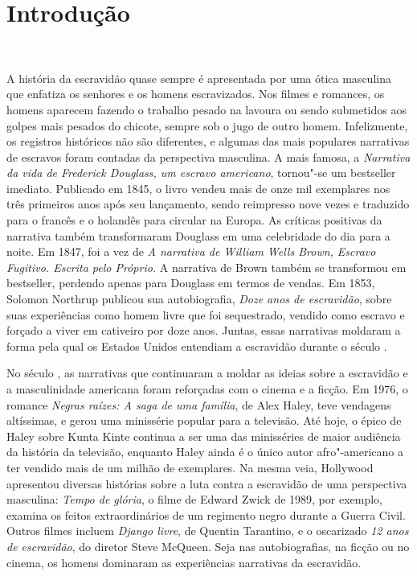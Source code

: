 \chapter*{Introdução} %

\begin{flushright}
\\\vspace{-3pt}
\end{flushright}

A história da escravidão quase sempre é apresentada por uma ótica
masculina que enfatiza os senhores e os homens escravizados. Nos filmes
e romances, os homens aparecem fazendo o trabalho pesado na lavoura ou
sendo submetidos aos golpes mais pesados do chicote, sempre sob o jugo
de outro homem. Infelizmente, os registros históricos não são
diferentes, e algumas das mais populares narrativas de escravos foram
contadas da perspectiva masculina. A mais famosa, a \emph{Narrativa da
vida de Frederick Douglass, um escravo americano}, tornou"-se um
bestseller imediato. Publicado em 1845, o livro vendeu mais de onze mil
exemplares nos três primeiros anos após seu lançamento, sendo reimpresso
nove vezes e traduzido para o francês e o holandês para circular na
Europa. As críticas positivas da narrativa também transformaram Douglass
em uma celebridade do dia para a noite. Em 1847, foi a vez de \emph{A
narrativa de William Wells Brown, Escravo Fugitivo. Escrita pelo
Próprio.} A narrativa de Brown também se transformou em bestseller,
perdendo apenas para Douglass em termos de vendas. Em 1853, Solomon
Northrup publicou sua autobiografia, \emph{Doze anos de escravidão},
sobre suas experiências como homem livre que foi sequestrado, vendido
como escravo e forçado a viver em cativeiro por doze anos. Juntas, essas
narrativas moldaram a forma pela qual os Estados Unidos entendiam a escravidão
durante o século .

No século , as narrativas que continuaram a moldar as ideias sobre a
escravidão e a masculinidade americana foram reforçadas com o cinema e a
ficção. Em 1976, o romance \emph{Negras raízes: A saga de uma família},
de Alex Haley, teve vendagens altíssimas, e gerou uma minissérie popular para a
televisão. Até hoje, o épico de Haley sobre Kunta Kinte continua a ser
uma das minisséries de maior audiência da história da televisão,
enquanto Haley ainda é o único autor afro"-americano a ter vendido mais
de um milhão de exemplares. Na mesma veia, Hollywood apresentou diversas
histórias sobre a luta contra a escravidão de uma perspectiva masculina:
\emph{Tempo de glória}, o filme de Edward Zwick de 1989, por exemplo,
examina os feitos extraordinários de um regimento negro durante a Guerra
Civil. Outros filmes incluem \emph{Django livre}, de Quentin Tarantino,
e o oscarizado \emph{12 anos de escravidão}, do diretor Steve McQueen.
Seja nas autobiografias, na ficção ou no cinema, os homens dominaram as
experiências narrativas da escravidão.

